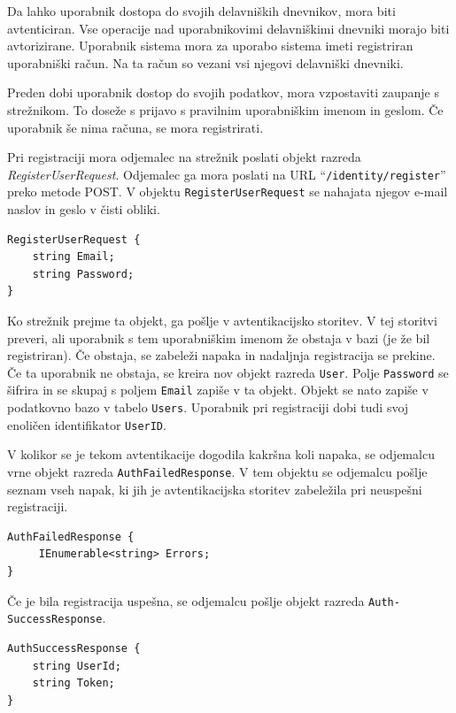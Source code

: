 \documentclass[a4paper, 12pt]{book}
\begin{document}
Da lahko uporabnik dostopa do svojih delavniških dnevnikov, mora biti avtenticiran.
Vse operacije nad uporabnikovimi delavniškimi dnevniki morajo biti avtorizirane.
Uporabnik sistema mora za uporabo sistema imeti registriran uporabniški račun.
Na ta račun so vezani vsi njegovi delavniški dnevniki.

Preden dobi uporabnik dostop do svojih podatkov, mora vzpostaviti zaupanje s strežnikom.
To doseže s prijavo s pravilnim uporabniškim imenom in geslom.
Če uporabnik še nima računa, se mora registrirati.

Pri registraciji mora odjemalec na strežnik poslati objekt razreda \textit{RegisterUserRequest}.
Odjemalec ga mora poslati na URL \enquote{\texttt{/identity/register}} preko metode POST.
V objektu \texttt{RegisterUserRequest} se nahajata njegov e-mail naslov in geslo v čisti obliki.

\begin{verbatim}
RegisterUserRequest {
    string Email; 
    string Password; 
} 
\end{verbatim}


Ko strežnik prejme ta objekt, ga pošlje v avtentikacijsko storitev.
V tej storitvi preveri, ali uporabnik s tem uporabniškim imenom že obstaja v bazi (je že bil registriran).
Če obstaja, se zabeleži napaka in nadaljnja registracija se prekine.
Če ta uporabnik ne obstaja, se kreira nov objekt razreda \texttt{User}.
Polje \texttt{Password} se šifrira in se skupaj s poljem \texttt{Email} zapiše v ta objekt.
Objekt se nato zapiše v podatkovno bazo v tabelo \texttt{Users}.
Uporabnik pri registraciji dobi tudi svoj enoličen identifikator \texttt{UserID}.

V kolikor se je tekom avtentikacije dogodila kakršna koli napaka, se odjemalcu vrne objekt razreda \texttt{AuthFailedResponse}.
V tem objektu se odjemalcu pošlje seznam vseh napak, ki jih je avtentikacijska storitev zabeležila pri neuspešni registraciji. 

\begin{verbatim}
AuthFailedResponse { 
     IEnumerable<string> Errors; 
}
\end{verbatim}


Če je bila registracija uspešna, se odjemalcu pošlje objekt razreda \texttt{Auth-\\SuccessResponse}.

\begin{verbatim}
AuthSuccessResponse { 
    string UserId; 
    string Token; 
} 
\end{verbatim}
\end{document}
